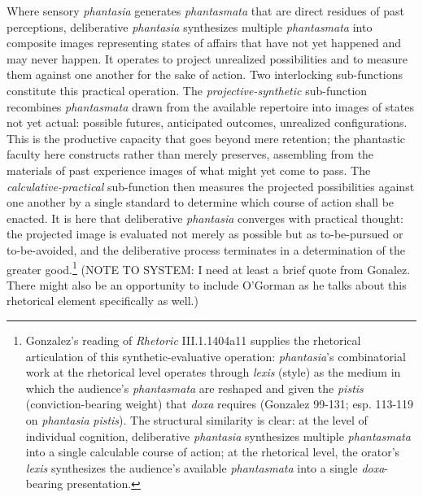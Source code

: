 \documentclass{article}
\begin{document}
Where sensory \textit{phantasia} generates \textit{phantasmata} that are direct residues of past perceptions, deliberative \textit{phantasia} synthesizes multiple \textit{phantasmata} into composite images representing states of affairs that have not yet happened and may never happen. It operates to project unrealized possibilities and to measure them against one another for the sake of action. Two interlocking sub-functions constitute this practical operation. The \textit{projective-synthetic} sub-function recombines \textit{phantasmata} drawn from the available repertoire into images of states not yet actual: possible futures, anticipated outcomes, unrealized configurations. This is the productive capacity that goes beyond mere retention; the phantastic faculty here constructs rather than merely preserves, assembling from the materials of past experience images of what might yet come to pass. The \textit{calculative-practical} sub-function then measures the projected possibilities against one another by a single standard to determine which course of action shall be enacted. It is here that deliberative \textit{phantasia} converges with practical thought: the projected image is evaluated not merely as possible but as to-be-pursued or to-be-avoided, and the deliberative process terminates in a determination of the greater good.\footnote{Gonzalez's reading of \textit{Rhetoric} III.1.1404a11 supplies the rhetorical articulation of this synthetic-evaluative operation: \textit{phantasia}'s combinatorial work at the rhetorical level operates through \textit{lexis} (style) as the medium in which the audience's \textit{phantasmata} are reshaped and given the \textit{pistis} (conviction-bearing weight) that \textit{doxa} requires (Gonzalez 99-131; esp. 113-119 on  \textit{phantasia} \textit{pistis}). The structural similarity is clear: at the level of individual cognition, deliberative \textit{phantasia} synthesizes multiple \textit{phantasmata} into a single calculable course of action; at the rhetorical level, the orator's \textit{lexis} synthesizes the audience's available \textit{phantasmata} into a single \textit{doxa}-bearing presentation.} (NOTE TO SYSTEM: I need at least a brief quote from Gonalez. There might also be an opportunity to include O'Gorman as he talks about this rhetorical element specifically as well.)
\end{document}
